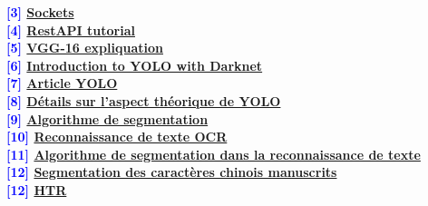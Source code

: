 {\textbf{\textcolor{blue}{[3]} \href{https://docs.python.org/3/library/socket.html}{Sockets}} \\

\textbf{\textcolor{blue}{[4]} \href{https://www.youtube.com/watch?v=GMppyAPbLYk}{RestAPI tutorial}}\\

\textbf{\textcolor{blue}{[5]} \href{https://www.mathworks.com/help/deeplearning/ref/vgg16.html}{VGG-16 expliquation}} \\


\textbf{\textcolor{blue}{[6]} \href{https://www.datacorner.fr/yolo-intro/}{Introduction to YOLO with Darknet}} \\

\textbf{\textcolor{blue}{[7]} \href{https://pjreddie.com/media/files/papers/yolo.pdf}{Article YOLO}} \\


\textbf{\textcolor{blue}{[8]} \href{https://www.aqsone.com/blog/2021/data-science-fr/comment-detecter-les-objets-plus-efficacement-avec-yolo/}{Détails sur l'aspect théorique de YOLO}} \\

\textbf{\textcolor{blue}{[9]} \href{https://blog.51cto.com/u_15435490/4632460}{Algorithme de segmentation}} \\

\textbf{\textcolor{blue}{[10]} \href{https://www.bilibili.com/video/BV1Wi4y1d7u1?spm_id_from=333.337.search-card.all.click}{Reconnaissance de texte OCR}} \\

\textbf{\textcolor{blue}{[11]} \href{https://blog.csdn.net/lin_ff/article/details/87307904?spm=1001.2101.3001.6650.5&utm_medium=distribute.pc_relevant.none-task-blog-2~default~BlogCommendFromBaidu~Rate-5-87307904-blog-108687481.pc_relevant_paycolumn_v3&depth_1-utm_source=distribute.pc_relevant.none-task-blog-2~default~BlogCommendFromBaidu~Rate-5-87307904-blog-108687481.pc_relevant_paycolumn_v3&utm_relevant_index=8
}{Algorithme de segmentation dans la reconnaissance de texte}} \\


\textbf{\textcolor{blue}{[12]} \href{https://blog.csdn.net/qq_40414818/article/details/84349232}{Segmentation des caractères chinois manuscrits}} \\


\textbf{\textcolor{blue}{[12]} \href{https://github.com/githubharald/SimpleHTR}{HTR}} \\


}
